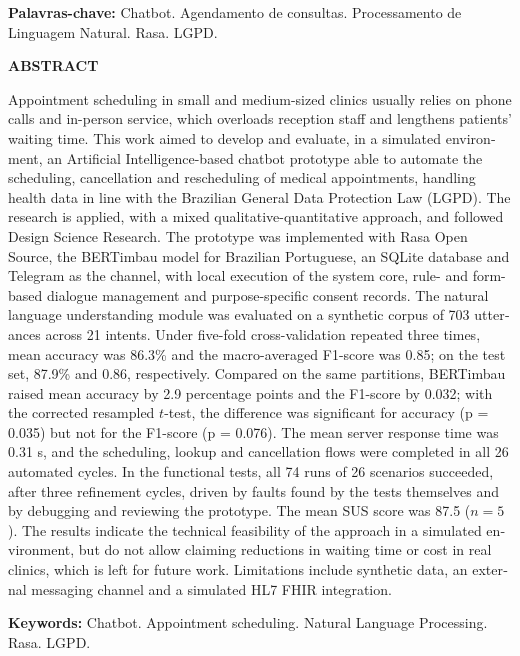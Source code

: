 \documentclass[12pt,a4paper]{extarticle}
\begin{document}
\vspace{0.5cm}
\noindent \textbf{Palavras-chave:} Chatbot. Agendamento de consultas. Processamento de Linguagem Natural. Rasa. LGPD.

\newpage
\begin{otherlanguage}{english}
\thispagestyle{empty}
\begin{center}
    \textbf{ABSTRACT}
\end{center}
\vspace{0.5cm}

\noindent Appointment scheduling in small and medium-sized clinics usually relies on phone calls and in-person service, which overloads reception staff and lengthens patients' waiting time. This work aimed to develop and evaluate, in a simulated environment, an Artificial Intelligence-based chatbot prototype able to automate the scheduling, cancellation and rescheduling of medical appointments, handling health data in line with the Brazilian General Data Protection Law (LGPD). The research is applied, with a mixed qualitative-quantitative approach, and followed Design Science Research. The prototype was implemented with Rasa Open Source, the BERTimbau model for Brazilian Portuguese, an SQLite database and Telegram as the channel, with local execution of the system core, rule- and form-based dialogue management and purpose-specific consent records. The natural language understanding module was evaluated on a synthetic corpus of 703 utterances across 21 intents. Under five-fold cross-validation repeated three times, mean accuracy was 86.3\% and the macro-averaged F1-score was 0.85; on the test set, 87.9\% and 0.86, respectively. Compared on the same partitions, BERTimbau raised mean accuracy by 2.9 percentage points and the F1-score by 0.032; with the corrected resampled $t$-test, the difference was significant for accuracy (p = 0.035) but not for the F1-score (p = 0.076). The mean server response time was 0.31 s, and the scheduling, lookup and cancellation flows were completed in all 26 automated cycles. In the functional tests, all 74 runs of 26 scenarios succeeded, after three refinement cycles, driven by faults found by the tests themselves and by debugging and reviewing the prototype. The mean SUS score was 87.5 ($n = 5$). The results indicate the technical feasibility of the approach in a simulated environment, but do not allow claiming reductions in waiting time or cost in real clinics, which is left for future work. Limitations include synthetic data, an external messaging channel and a simulated HL7 FHIR integration.

\vspace{0.5cm}
\noindent \textbf{Keywords:} Chatbot. Appointment scheduling. Natural Language Processing. Rasa. LGPD.
\end{otherlanguage}
\end{document}
